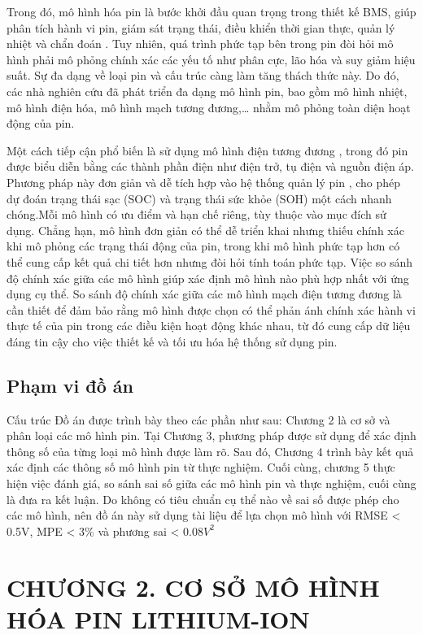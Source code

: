 \documentclass{thesis}
\begin{document}
    Trong đó, mô hình hóa pin là bước khởi đầu quan trọng trong thiết kế BMS, giúp phân tích hành vi pin, giám sát trạng thái, điều khiển thời gian thực, quản lý nhiệt và chẩn đoán \cite{shen2022}. Tuy nhiên, quá trình phức tạp bên trong pin đòi hỏi mô hình phải mô phỏng chính xác các yếu tố như phân cực, lão hóa và suy giảm hiệu suất. Sự đa dạng về loại pin và cấu trúc càng làm tăng thách thức này. Do đó, các nhà nghiên cứu đã phát triển đa dạng mô hình pin, bao gồm mô hình nhiệt, mô hình điện hóa, mô hình mạch tương đương,… nhằm mô phỏng toàn diện hoạt động của pin.
    
    Một cách tiếp cận phổ biến là sử dụng mô hình điện tương đương , trong đó pin được biểu diễn bằng các thành phần điện như điện trở, tụ điện và nguồn điện áp. Phương pháp này đơn giản và dễ tích hợp vào hệ thống quản lý pin , cho phép dự đoán trạng thái sạc (SOC) và trạng thái sức khỏe (SOH) một cách nhanh chóng.Mỗi mô hình có ưu điểm và hạn chế riêng, tùy thuộc vào mục đích sử dụng. Chẳng hạn, mô hình đơn giản có thể dễ triển khai nhưng thiếu chính xác khi mô phỏng các trạng thái động của pin, trong khi mô hình phức tạp hơn có thể cung cấp kết quả chi tiết hơn nhưng đòi hỏi tính toán phức tạp. Việc so sánh độ chính xác giữa các mô hình giúp xác định mô hình nào phù hợp nhất với ứng dụng cụ thể. So sánh độ chính xác giữa các mô hình mạch điện tương đương là cần thiết để đảm bảo rằng mô hình được chọn có thể phản ánh chính xác hành vi thực tế của pin trong các điều kiện hoạt động khác nhau, từ đó cung cấp dữ liệu đáng tin cậy cho việc thiết kế và tối ưu hóa hệ thống sử dụng pin.
    
    \subsection{Phạm vi đồ án}
    Cấu trúc Đồ án được trình bày theo các phần như sau: Chương 2 là cơ sở và phân loại các mô hình pin. Tại Chương 3, phương pháp được sử dụng để xác định thông số của từng loại mô hình được làm rõ. Sau đó, Chương 4 trình bày kết quả xác định các thông số mô hình pin từ thực nghiệm. Cuối cùng, chương 5 thực hiện việc đánh giá, so sánh sai số giữa các mô hình pin và thực nghiệm, cuối cùng là đưa ra kết luận. Do không có tiêu chuẩn cụ thể nào về sai số được phép cho các mô hình, nên đồ án này sử dụng tài liệu \cite{he2011} để lựa chọn mô hình với RMSE < 0.5V, MPE < 3\% và phương sai < 0.08\(V^2\)
    \newpage
    \section*{CHƯƠNG 2. CƠ SỞ MÔ HÌNH HÓA PIN LITHIUM-ION}
    \setcounter{section}{2}
    \setcounter{subsection}{0}
    \setcounter{figure}{0}
    \setcounter{table}{0}
\end{document}
